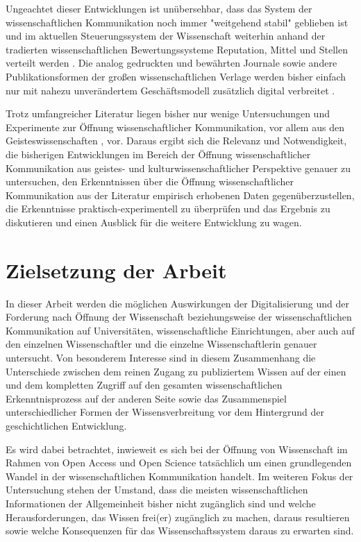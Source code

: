 Ungeachtet dieser Entwicklungen ist unübersehbar, dass das System der wissenschaftlichen Kommunikation noch immer "weitgehend stabil" \cite[:2]{Hanekop_2014} geblieben ist und im aktuellen Steuerungssystem der Wissenschaft weiterhin anhand der tradierten wissenschaftlichen Bewertungssysteme Reputation, Mittel und Stellen verteilt werden \cite{hollricher_wandel_2009} \cite{de_Vries_2001}. Die analog gedruckten und bewährten Journale sowie andere Publikationsformen der großen wissenschaftlichen Verlage werden bisher einfach nur mit nahezu unverändertem Geschäftsmodell zusätzlich digital verbreitet \cite{Hanekop_2014} \cite{BOAI_2012}.

Trotz umfangreicher Literatur liegen bisher nur wenige Untersuchungen und Experimente zur Öffnung wissenschaftlicher Kommunikation, vor allem aus den Geisteswissenschaften \cite{Naeder_2010}, vor. Daraus ergibt sich die Relevanz und Notwendigkeit, die bisherigen Entwicklungen im Bereich der Öffnung wissenschaftlicher Kommunikation aus geistes- und kulturwissenschaftlicher Perspektive genauer zu untersuchen, den Erkenntnissen über die Öffnung wissenschaftlicher Kommunikation aus der Literatur empirisch erhobenen Daten gegenüberzustellen, die Erkenntnisse praktisch-experimentell zu überprüfen und das Ergebnis zu diskutieren und einen Ausblick für die weitere Entwicklung zu wagen.

\section{Zielsetzung der Arbeit}

In dieser Arbeit werden die möglichen Auswirkungen der Digitalisierung und der Forderung nach Öffnung der Wissenschaft beziehungsweise der wissenschaftlichen Kommunikation auf Universitäten, wissenschaftliche Einrichtungen, aber auch auf den einzelnen Wissenschaftler und die einzelne Wissenschaftlerin genauer untersucht. Von besonderem Interesse sind in diesem Zusammenhang die Unterschiede zwischen dem reinen Zugang zu publiziertem Wissen auf der einen und dem kompletten Zugriff auf den gesamten wissenschaftlichen Erkenntnisprozess auf der anderen Seite sowie das Zusammenspiel unterschiedlicher Formen der Wissensverbreitung vor dem Hintergrund der geschichtlichen Entwicklung.

Es wird dabei betrachtet, inwieweit es sich bei der Öffnung von Wissenschaft im Rahmen von Open Access und Open Science tatsächlich um einen grundlegenden Wandel in der wissenschaftlichen Kommunikation handelt. Im weiteren Fokus der Untersuchung stehen der Umstand, dass die meisten wissenschaftlichen Informationen der Allgemeinheit bisher nicht zugänglich sind und welche Herausforderungen, das Wissen frei(er) zugänglich zu machen, daraus resultieren sowie welche Konsequenzen für das Wissenschaftssystem daraus zu erwarten sind.

